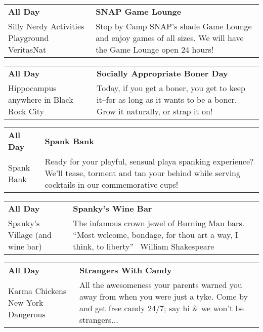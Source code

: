 \begin{tabular}{ p{1in} p{2.2in} }
    \textbf{All Day} & \textbf{SNAP Game Lounge} \\
    Silly Nerdy Activities Playground \newline VeritasNat & Stop by Camp SNAP's shade Game Lounge and enjoy games of all sizes. We will have the Game Lounge open 24 hours! \\
    \hline 
\end{tabular}
    
\begin{tabular}{ p{1in} p{2.2in} }
    \textbf{All Day} & \textbf{Socially Appropriate Boner Day} \\
    Hippocampus \newline anywhere in Black Rock City & Today, if you get a boner, you get to keep it--for as long as it wants to be a boner. Grow it naturally, or strap it on! \\
    \hline 
\end{tabular}
    
\begin{tabular}{ p{1in} p{2.2in} }
    \textbf{All Day} & \textbf{Spank Bank} \\
    Spank Bank \newline  & Ready for your playful, sensual playa spanking experience? We'll tease, torment and tan your behind while serving cocktails in our commemorative cups! \\
    \hline 
\end{tabular}
    
\begin{tabular}{ p{1in} p{2.2in} }
    \textbf{All Day} & \textbf{Spanky's Wine Bar} \\
    Spanky's Village (and wine bar) \newline  & The infamous crown jewel of Burning Man bars.  ``Most welcome, bondage, for thou art a way, I think, to liberty''  ~William Shakespeare~ \\
    \hline 
\end{tabular}
    
\begin{tabular}{ p{1in} p{2.2in} }
    \textbf{All Day} & \textbf{Strangers With Candy} \\
    Karma Chickens \newline New York Dangerous & All the awesomeness your parents warned you away from when you were just a tyke. Come by and get free candy 24/7; say hi \& we won't be strangers... \\
    \hline 
\end{tabular}
    
